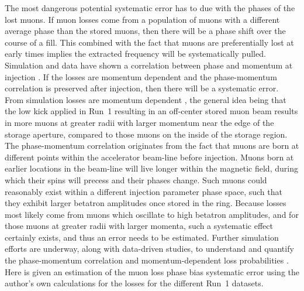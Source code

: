 The most dangerous potential systematic error has to due with the phases of the lost muons. If muon losses come from a population of muons with a different average phase than the stored muons, then there will be a phase shift over the course of a fill. This combined with the fact that muons are preferentially lost at early times implies the extracted \wa frequency will be systematically pulled. Simulation and data have shown a correlation between phase and momentum at injection \cite{HannahLossStudy,SudeshnaElbaTalk}. If the losses are momentum dependent and the phase-momentum correlation is preserved after injection, then there will be a systematic error. From simulation losses are momentum dependent \cite{MikeLosses}, the general idea being that the low kick applied in Run~1 resulting in an off-center stored muon beam results in more muons at greater radii with larger momentum near the edge of the storage aperture, compared to those muons on the inside of the storage region. The phase-momentum correlation originates from the fact that muons are born at different points within the accelerator beam-line before injection. Muons born at earlier locations in the beam-line will live longer within the magnetic field, during which their spins will precess and their \gmtwo phases change. Such muons could reasonably exist within a different injection parameter phase space, such that they exhibit larger betatron amplitudes once stored in the ring. Because losses most likely come from muons which oscillate to high betatron amplitudes, and for those muons at greater radii with larger momenta, such a systematic effect certainly exists, and thus an error needs to be estimated. Further simulation efforts are underway, along with data-driven studies, to understand and quantify the phase-momentum correlation and momentum-dependent loss probabilities \cite{MikeLosses,HannahLossStudy2}. Here is given an estimation of the muon loss phase bias systematic error using the author's own calculations for the losses for the different Run~1 datasets.


